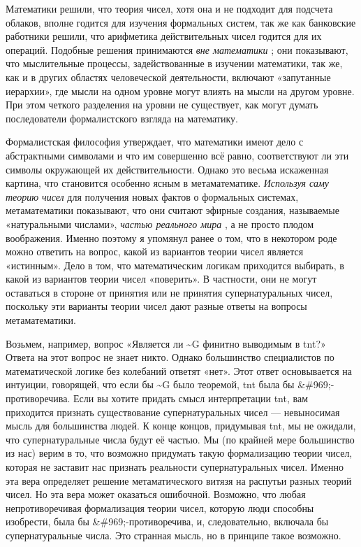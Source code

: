\documentclass[../main.tex]{subfiles}
\begin{document}
Математики решили, что теория чисел, хотя она и не подходит для подсчета облаков, вполне годится для изучения формальных систем, так же как банковские работники решили, что арифметика действительных чисел годится для их операций. Подобные решения принимаются \emph{вне математики} ; они показывают, что мыслительные процессы, задействованные в изучении математики, так же, как и в других областях человеческой деятельности, включают «запутанные иерархии», где мысли на одном уровне могут влиять на мысли на другом уровне. При этом четкого разделения на уровни не существует, как могут думать последователи формалистского взгляда на математику.

Формалистская философия утверждает, что математики имеют дело с абстрактными символами и что им совершенно всё равно, соответствуют ли эти символы окружающей их действительности. Однако это весьма искаженная картина, что становится особенно ясным в метаматематике. \emph{Используя саму теорию чисел} для получения новых фактов о формальных системах, метаматематики показывают, что они считают эфирные создания, называемые «натуральными числами», \emph{частью реального мира} , а не просто плодом воображения. Именно поэтому я упомянул ранее о том, что в некотором роде можно ответить на вопрос, какой из вариантов теории чисел является «истинным». Дело в том, что математическим логикам приходится выбирать, в какой из вариантов теории чисел «поверить». В частности, они не могут оставаться в стороне от принятия или не принятия супернатуральных чисел, поскольку эти варианты теории чисел дают разные ответы на вопросы метаматематики.

Возьмем, например, вопрос «Является ли \textasciitilde G финитно выводимым в \acs{tnt}?» Ответа на этот вопрос не знает никто. Однако большинство специалистов по математической логике без колебаний ответят «нет». Этот ответ основывается на интуиции, говорящей, что если бы \textasciitilde G было теоремой, \acs{tnt} была бы \&\#969;-противоречива. Если вы хотите придать смысл интерпретации \acs{tnt}, вам приходится признать существование супернатуральных чисел --- невыносимая мысль для большинства людей. К конце концов, придумывая \acs{tnt}, мы не ожидали, что супернатуральные числа будут её частью. Мы (по крайней мере большинство из нас) верим в то, что возможно придумать такую формализацию теории чисел, которая не заставит нас признать реальности супернатуральных чисел. Именно эта вера определяет решение метаматического витязя на распутьи разных теорий чисел. Но эта вера может оказаться ошибочной. Возможно, что любая непротиворечивая формализация теории чисел, которую люди способны изобрести, была бы \&\#969;-противоречива, и, следовательно, включала бы супернатуральные числа. Это странная мысль, но в принципе такое возможно.
\end{document}
